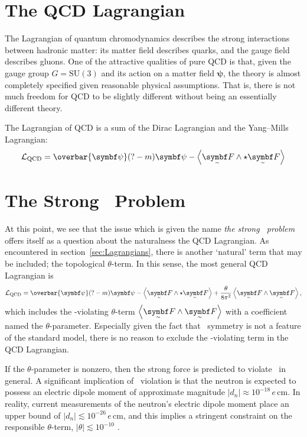 



\section{The QCD Lagrangian}

The Lagrangian of quantum chromodynamics describes the strong interactions between hadronic matter: its matter field describes quarks, and the gauge field describes gluons.
One of the attractive qualities of pure QCD is that, given the gauge group $G = \mathrm{SU}(3)$ and its action on a matter field $\bm\psi$, the theory is almost completely specified given reasonable physical assumptions.
That is, there is not much freedom for QCD to be slightly different without being an essentially different theory.

The Lagrangian of QCD is a sum of the Dirac Lagrangian and the Yang--Mills Lagrangian:
\begin{align}
	\cal L_\text{QCD} = \overbar{\bm\psi}\qty(? - m)\bm\psi - \ang{\tsbm F \wedge\star \tsbm F}
\end{align}



\section{The Strong \CP\ Problem}

At this point, we see that the issue which is given the name \emph{the strong \CP\ problem} offers itself as a question about the naturalness the QCD Lagrangian.
As encountered in section~\ref{sec:Lagrangians}, there is another `natural' term that may be included; the topological $\theta$-term.
In this sense, the most general QCD Lagrangian is
\begin{align}
	\cal L_\text{QCD} = \overbar{\bm\psi}\qty(? - m)\bm\psi
	- \ang{\tsbm F \wedge\star \tsbm F}
	+ \frac{\theta}{8\pi^2}\ang{\tsbm F \wedge \tsbm F}
,\end{align}
which includes the \CP-violating $\theta$-term $\ang{\tsbm F\wedge\tsbm F}$ with a coefficient named the $\theta$-parameter.
Especially given the fact that \CP\ symmetry is not a feature of the standard model, there is no reason to exclude the \CP-violating term in the QCD Lagrangian.


If the $\theta$-parameter is nonzero, then the strong force is predicted to violate \CP\ in general.
A significant implication of \CP\ violation is that the neutron is expected to possess an electric dipole moment of approximate magnitude $|d_n| \approx 10^{-18} \,e\,\mathrm{cm}$.
In reality, current measurements \cite{electric_dipole_neutron_2020} of the neutron's electric dipole moment place an upper bound of $|d_n| \lesssim 10^{-26} \,e\,\mathrm{cm}$, and this implies a stringent constraint on the responsible $\theta$-term, $|\theta| \lesssim 10^{-10}$ \cite{Review_2018}.

